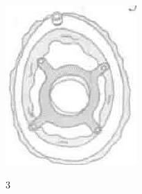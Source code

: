 \documentclass[10pt]{article}
\begin{document}
\begin{center}
\includegraphics[max width=\textwidth]{2024_07_05_645bb794a4d4f32ee0c8g-283(2)}
\end{center}

3
\end{document}
